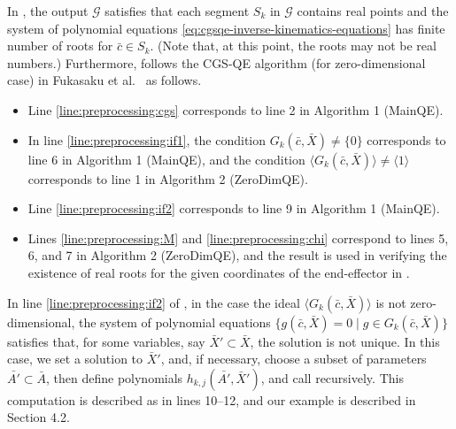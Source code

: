 \documentclass{birkjour}
\theoremstyle{plain}
\theoremstyle{definition}
\newtheorem{remark}[theorem]{Remark}
\newcommand{\cbar}[0]{\bar{c}}
\newcommand{\Xbar}{\bar{X}}
\begin{document}
    In , the output $\mathcal{G}$ satisfies that each segment 
    $S_{k}$ in $\mathcal{G}$ contains real points and the system of polynomial equations  
    \eqref{eq:cgsqe-inverse-kinematics-equations} has finite number of roots
    for $\bar{c}\in S_{k}$. (Note that, at this point, the roots may not be real numbers.)
    Furthermore,  follows the CGS-QE algorithm (for zero-dimensional case) in Fukasaku et al.\ \cite{fuk-iwa-sat2015} as follows.
    \begin{itemize}
        \item Line \ref{line:preprocessing:cgs} corresponds to line 2 in Algorithm 1 (MainQE).
        \item In line \ref{line:preprocessing:if1}, the condition $G_{k}(\cbar,\Xbar)\ne\{0\}$ corresponds to line 6 in Algorithm 1 (MainQE), and the condition 
        $\langle G_{k}(\cbar,\Xbar)\rangle\ne \langle 1\rangle$
        corresponds to line 1 in Algorithm 2 (ZeroDimQE). 
        \item Line \ref{line:preprocessing:if2} corresponds to line 9 in Algorithm 1 (MainQE). 
        \item Lines \ref{line:preprocessing:M} and \ref{line:preprocessing:chi} correspond to
         lines 5, 6, and 7 in Algorithm 2 (ZeroDimQE), and the result is used in verifying the existence of real roots for the given coordinates of the end-effector in 
         .
    \end{itemize}

    In line \ref{line:preprocessing:if2} of , in the case the ideal $\langle G_k(\bar{c}, \bar{X})\rangle$ is not zero-dimensional,
    the system of polynomial equations 
    $\{g(\bar{c},\bar{X})=0\mid g\in G_k(\bar{c},\bar{X})\}$
    satisfies that, for some variables, say 
    $\bar{X}'\subset\bar{X}$, the solution is not unique. 
    In this case, we set a solution to $\bar{X}'$,
    and, if necessary, choose a subset of parameters $\bar{A'}\subset\bar{A}$,
    then define polynomials
    $h_{k,j}(\bar{A'},\bar{X}')$, and call  recursively.
    This computation is described as in lines 10--12, and our example is described in Section 4.2.
\end{document}
